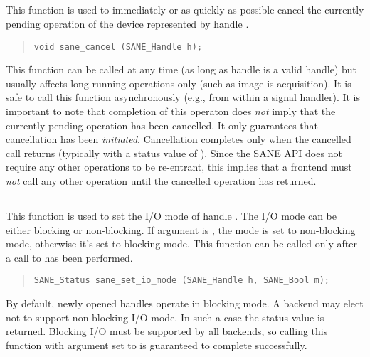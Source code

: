 \documentclass[11pt,DVIps]{report}
\begin{document}
\subsection{}

This function is used to immediately or as quickly as possible cancel
the currently pending operation of the device represented by handle
.
\begin{quote}
\begin{verbatim}
void sane_cancel (SANE_Handle h);
\end{verbatim}
\end{quote}
This function can be called at any time (as long as handle  is
a valid handle) but usually affects long-running operations only (such
as image is acquisition).  It is safe to call this function
asynchronously (e.g., from within a signal handler).  It is important
to note that completion of this operaton does {\em not\/} imply that
the currently pending operation has been cancelled.  It only
guarantees that cancellation has been {\em initiated}.  Cancellation
completes only when the cancelled call returns (typically with a
status value of ).  Since the SANE API
does not require any other operations to be re-entrant, this implies
that a frontend must {\em not\/} call any other operation until the
cancelled operation has returned.


\subsection{}

This function is used to set the I/O mode of handle .  The I/O mode
can be either blocking or non-blocking.  If argument  is
, the mode is set to non-blocking mode, otherwise it's set to
blocking mode.  This function can be called only after a call to
 has been performed.
\begin{quote}
\begin{verbatim}
SANE_Status sane_set_io_mode (SANE_Handle h, SANE_Bool m);
\end{verbatim}
\end{quote}
By default, newly opened handles operate in blocking mode.  A backend
may elect not to support non-blocking I/O mode.  In such a case the
status value  is returned.  Blocking
I/O must be supported by all backends, so calling this function with
argument  set to  is guaranteed to complete
successfully.
\end{document}
